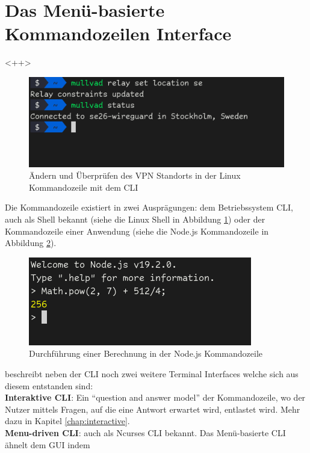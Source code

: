\documentclass[oneside,bibliography=totocnumbered,BCOR=5mm]{scrbook}
\begin{document}
\section{Das Menü-basierte Kommandozeilen Interface}

<++>

\begin{figure}
  \centering
  \includegraphics[scale=0.5]{mullvad-status.png}
  \caption{Ändern und Überprüfen des VPN Standorts in der Linux Kommandozeile mit dem  CLI}
  \label{fig:mullvad-status}
\end{figure}

Die Kommandozeile existiert in zwei Ausprägungen: dem Betriebssystem CLI, auch
als Shell bekannt (siehe die Linux Shell in Abbildung \ref{fig:mullvad-status})
oder der Kommandozeile einer Anwendung (siehe die Node.js Kommandozeile in
Abbildung \ref{fig:node-calc}).

\begin{figure}
  \centering
  \includegraphics[scale=0.5]{node-calc.png}
  \caption{Durchführung einer Berechnung in der Node.js Kommandozeile}
  \label{fig:node-calc}
\end{figure}

\cite{Spolsky_2001} beschreibt neben der CLI noch zwei weitere Terminal Interfaces welche sich aus diesem entstanden sind:
\\
\textbf{Interaktive CLI}: Ein ``question and answer model'' \parencite[42]{Spolsky_2001} der Kommandozeile, wo der Nutzer mittels Fragen, auf die eine Antwort erwartet wird, entlastet wird. Mehr dazu in Kapitel \ref{chap:interactive}.
\\
\textbf{Menu-driven CLI}: auch als Ncurses CLI bekannt. Das Menü-basierte CLI ähnelt dem GUI indem
\end{document}
